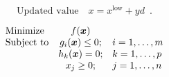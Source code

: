 \documentclass[a4paper]{article}
\begin{document}

    \begin{equation*}
        \mbox{Updated value}\quad x = x^\mathrm{low} + yd \enspace .
    \end{equation*}

    \begin{equation*}
        \begin{array}{lcl}
        \mbox{Minimize}   & f(\mbox{\boldmath{$x$}})            &\\
        \mbox{Subject to} & g_i(\mbox{\boldmath{$x$}}) \leq 0 ; & i=1,\ldots,m\\
                          & h_k(\mbox{\boldmath{$x$}}) = 0 ;    & k=1,\ldots,p\\
                          & x_j \geq 0 ;                        & j=1,\ldots,n
        \end{array}
    \end{equation*}
\end{document}
